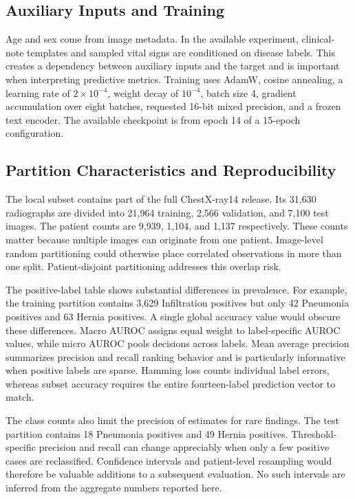 \documentclass[conference,letterpaper]{IEEEtran}
\begin{document}
\subsection{Auxiliary Inputs and Training}

Age and sex come from image metadata. In the available experiment, clinical-note templates and sampled vital signs are conditioned on disease labels. This creates a dependency between auxiliary inputs and the target and is important when interpreting predictive metrics. Training uses AdamW, cosine annealing, a learning rate of $2\times10^{-4}$, weight decay of $10^{-4}$, batch size 4, gradient accumulation over eight batches, requested 16-bit mixed precision, and a frozen text encoder. The available checkpoint is from epoch 14 of a 15-epoch configuration.

\subsection{Partition Characteristics and Reproducibility}

The local subset contains part of the full ChestX-ray14 release. Its 31,630 radiographs are divided into 21,964 training, 2,566 validation, and 7,100 test images. The patient counts are 9,939, 1,104, and 1,137 respectively. These counts matter because multiple images can originate from one patient. Image-level random partitioning could otherwise place correlated observations in more than one split. Patient-disjoint partitioning addresses this overlap risk.

The positive-label table shows substantial differences in prevalence. For example, the training partition contains 3,629 Infiltration positives but only 42 Pneumonia positives and 63 Hernia positives. A single global accuracy value would obscure these differences. Macro AUROC assigns equal weight to label-specific AUROC values, while micro AUROC pools decisions across labels. Mean average precision summarizes precision and recall ranking behavior and is particularly informative when positive labels are sparse. Hamming loss counts individual label errors, whereas subset accuracy requires the entire fourteen-label prediction vector to match.

The class counts also limit the precision of estimates for rare findings. The test partition contains 18 Pneumonia positives and 49 Hernia positives. Threshold-specific precision and recall can change appreciably when only a few positive cases are reclassified. Confidence intervals and patient-level resampling would therefore be valuable additions to a subsequent evaluation. No such intervals are inferred from the aggregate numbers reported here.
\end{document}
